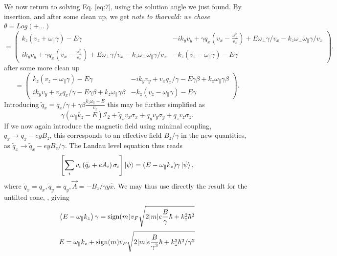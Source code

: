 We now return to solving Eq. \eqref{eq:7}, using the solution angle we just found.
By insertion, and after some clean up, we get
\emph{note to thorvald: we chose \(\theta = Log \left(+ \dots\right) \)}
\begin{equation}
  \label{eq:16}
  =
  \begin{pmatrix}
    k_z (v_{z} + \omega_{\parallel} \gamma) - E \gamma   & -i k_{y} v_{y} + \gamma q_{x} (v_{x} - \frac{\omega_{\perp}^{2}}{v_{x}}) + E \omega_{\perp} \gamma /v_{x} - k_{z} \omega _{\perp} \omega _{\parallel} \gamma /v_{x}\\
    i k_{y} v_{y} + \gamma q_{x} (v_{x} - \frac{\omega_{\perp}^{2}}{v_{x}}) + E \omega_{\perp} \gamma /v_{x} - k_{z} \omega _{\perp} \omega _{\parallel} \gamma  / v_{x}
    & -k_{z} (v_{z} - \omega_{\parallel} \gamma) - E \gamma
  \end{pmatrix}.
\end{equation}
after some more clean up
\begin{equation}
  \label{eq:17}
  =
  \begin{pmatrix}
    k_z (v_{z} + \omega_{\parallel} \gamma) - E \gamma   & -i k_{y} v_{y} + v_{x} q_{x} / \gamma  - E  \gamma \beta  + k_{z} \omega _{\parallel} \gamma \beta \\
    i k_{y} v_{y} + v_{x} q_{x} / \gamma  - E  \gamma \beta  + k_{z} \omega _{\parallel} \gamma \beta
    & -k_{z} (v_{z} - \omega_{\parallel} \gamma) - E \gamma
  \end{pmatrix}.
\end{equation}
Introducing \(\tilde{q}_{x} = q_{x} / \gamma + \gamma \beta \frac{k_{z} \omega_{\parallel} - E}{v_{x}}\) this may be further simplified as
\begin{equation}
  \label{eq:18}
  \gamma (\omega_{\parallel} k_{z} - E) \mathcal{I}_{2} + \tilde{q}_{x} v_{x} \sigma _{x} + q_{y} v_{y} \sigma _{y} + q_{z} v_{z} \sigma _{z}.
\end{equation}
If we now again introduce the magnetic field using minimal coupling, \(q_{x} \to  q_{x} - ey B_{z} \), this corresponds to an effective field \(B_{z} / \gamma \) in the new quantities, as \(\tilde{q}_{x} \to  \tilde{q}_{x} - e y B_{z} /\gamma \).
The Landau level equation thus reads
\begin{equation}
  \label{eq:19}
  \left[
  \sum\limits_{i} v_{i} \left(\tilde{q}_{i} + e A_{i} \right) \sigma _{i}
\right  ] \ket{\tilde{\psi}} =
(E-\omega_{\parallel} k_{z}) \gamma \ket{\tilde{\psi}},
\end{equation}
where \( \tilde{q}_{x} = q_{x}, \tilde{q}_{y} = q_{y}, \vec{A}=-B_{z} / \gamma  y \hat{x}\).
We may thus use directly the result for the untilted cone, , giving
\begin{equation}
  \label{eq:20}
  \left(E-\omega _{\parallel} k_{z} \right) \gamma = \operatorname{sign} (m) v_{F} \sqrt{2 |m| e \frac{B}{\gamma } \hbar + k_{z}^2 \hbar ^2}
\end{equation}
\begin{equation}
  \label{eq:21}
  E = \omega _{\parallel} k_{z} + \operatorname{sign}(m) v_{F} \sqrt{2 |m| e \frac{B}{\gamma ^3} \hbar + k_{z}^2\hbar ^2 /\gamma ^2}
\end{equation}

